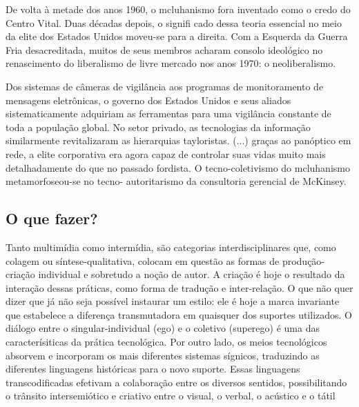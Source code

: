\begin{citacao}
De volta à metade dos anos 1960, o mcluhanismo fora inventado
como o credo do Centro Vital. Duas décadas depois, o signifi cado dessa teoria essencial no meio da elite dos Estados Unidos moveu-se para a direita. Com a Esquerda da Guerra Fria desacreditada, muitos de seus membros acharam consolo ideológico no renascimento do liberalismo de livre mercado nos anos 1970: o neoliberalismo.\cite[347]{Barbrook2009}
\end{citacao}

\begin{citacao}
Dos sistemas de câmeras de vigilância aos programas de monitoramento de mensagens eletrônicas, o governo dos Estados Unidos e seus aliados sistematicamente adquiriam as ferramentas para uma vigilância constante de toda a população global. No setor privado, as tecnologias da informação similarmente revitalizaram as hierarquias tayloristas. (...) graças ao panóptico em rede, a elite corporativa era agora capaz de controlar suas vidas muito mais detalhadamente do que no passado fordista. O tecno-coletivismo do mcluhanismo metamorfoseou-se no tecno- autoritarismo da consultoria gerencial de McKinsey. \cite[345]{Barbrook2009}
\end{citacao}


\subsection{O que fazer?} 

\begin{citacao}
Tanto multimídia como intermídia, são categorias interdisciplinares que, como colagem ou síntese-qualitativa, colocam em questão as formas de produção-criação individual e sobretudo a noção de autor. A criação é hoje o resultado da interação dessas práticas, como forma de tradução e inter-relação. O que não quer dizer que já não seja possível instaurar um estilo: ele é hoje a marca invariante que estabelece a diferença transmutadora em quaisquer dos suportes utilizados. O diálogo entre o singular-individual (ego) e o coletivo (superego) é uma das caracterísiticas da prática tecnológica. Por outro lado, os meios tecnológicos absorvem e incorporam os mais diferentes sistemas sígnicos, traduzindo as diferentes linguagens históricas para o novo suporte. Essas linguagens transcodificadas efetivam a colaboração entre os diversos sentidos, possibilitando o trânsito intersemiótico e criativo entre o visual, o verbal, o acústico e o tátil \cite[66]{JulioPlaza1969}
\end{citacao}

